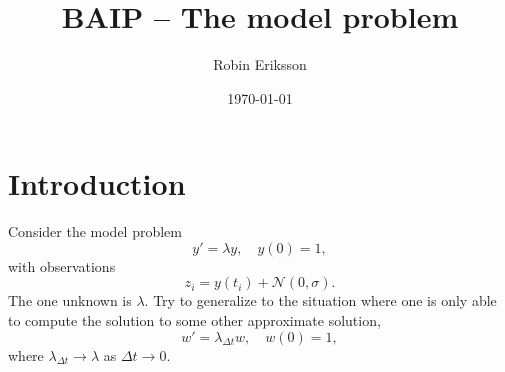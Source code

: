 \documentclass{amsart}
\numberwithin{equation}{section}
\numberwithin{table}{section}
\numberwithin{figure}{section}
\theoremstyle{plain}
\theoremstyle{definition}
\theoremstyle{remark}
\begin{document}

\title[]{BAIP -- The model problem}

\author[R. Eriksson]{Robin Eriksson}



\date{\today}



\maketitle

\section{Introduction}
Consider the model problem
\begin{equation}
  \label{eq:model}
  y' = \lambda y,\quad y(0) = 1,
\end{equation}
with observations
\begin{equation}
  \label{eq:observations}
  z_i = y(t_i) + \mathcal{N}(0,\sigma).
\end{equation}
The one unknown is $\lambda$. Try to generalize to the situation where
one is only able to compute the solution to some other approximate
solution,
\begin{equation}
  \label{eq:apsol}
  w' = \lambda_{\Delta t} w,\quad w(0) = 1,
\end{equation}
where $\lambda_{\Delta t} \to \lambda$ as $\Delta t \to 0$.
\end{document}
